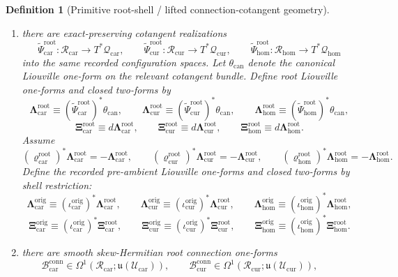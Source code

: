 \documentclass[11pt]{article}
\newcommand{\RootTensorClass}{\mathscr U_{\mathrm{car}}}
\newcommand{\RootRelabelClass}{\mathscr U_{\mathrm{cur}}}
\newcommand{\TensorConfigSpace}{\mathcal Q_{\mathrm{car}}}
\newcommand{\CurConfigSpace}{\mathcal Q_{\mathrm{cur}}}
\newcommand{\HomConfigSpace}{\mathcal Q_{\mathrm{hom}}}
\newcommand{\TensorOriginLiouville}{\boldsymbol{\Lambda}_{\mathrm{car}}^{\mathrm{orig}}}
\newcommand{\CurOriginLiouville}{\boldsymbol{\Lambda}_{\mathrm{cur}}^{\mathrm{orig}}}
\newcommand{\HomOriginLiouville}{\boldsymbol{\Lambda}_{\mathrm{hom}}^{\mathrm{orig}}}
\newcommand{\TensorOriginTwo}{\boldsymbol{\Xi}_{\mathrm{car}}^{\mathrm{orig}}}
\newcommand{\CurOriginTwo}{\boldsymbol{\Xi}_{\mathrm{cur}}^{\mathrm{orig}}}
\newcommand{\HomOriginTwo}{\boldsymbol{\Xi}_{\mathrm{hom}}^{\mathrm{orig}}}
\newcommand{\TensorRootSpace}{\mathcal R_{\mathrm{car}}}
\newcommand{\CurRootSpace}{\mathcal R_{\mathrm{cur}}}
\newcommand{\HomRootSpace}{\mathcal R_{\mathrm{hom}}}
\newcommand{\TensorRootTimeRev}{\varrho_{\mathrm{car}}^{\mathrm{root}}}
\newcommand{\CurRootTimeRev}{\varrho_{\mathrm{cur}}^{\mathrm{root}}}
\newcommand{\HomRootTimeRev}{\varrho_{\mathrm{hom}}^{\mathrm{root}}}
\newcommand{\TensorOriginInc}{\iota_{\mathrm{car}}^{\mathrm{orig}}}
\newcommand{\CurOriginInc}{\iota_{\mathrm{cur}}^{\mathrm{orig}}}
\newcommand{\HomOriginInc}{\iota_{\mathrm{hom}}^{\mathrm{orig}}}
\newcommand{\TensorRootCotangentRealization}{\widetilde{\Psi}_{\mathrm{car}}^{\mathrm{root}}}
\newcommand{\CurRootCotangentRealization}{\widetilde{\Psi}_{\mathrm{cur}}^{\mathrm{root}}}
\newcommand{\HomRootCotangentRealization}{\widetilde{\Psi}_{\mathrm{hom}}^{\mathrm{root}}}
\newcommand{\TensorRootLiouville}{\boldsymbol{\Lambda}_{\mathrm{car}}^{\mathrm{root}}}
\newcommand{\CurRootLiouville}{\boldsymbol{\Lambda}_{\mathrm{cur}}^{\mathrm{root}}}
\newcommand{\HomRootLiouville}{\boldsymbol{\Lambda}_{\mathrm{hom}}^{\mathrm{root}}}
\newcommand{\TensorRootTwo}{\boldsymbol{\Xi}_{\mathrm{car}}^{\mathrm{root}}}
\newcommand{\CurRootTwo}{\boldsymbol{\Xi}_{\mathrm{cur}}^{\mathrm{root}}}
\newcommand{\HomRootTwo}{\boldsymbol{\Xi}_{\mathrm{hom}}^{\mathrm{root}}}
\newcommand{\TensorRootConnectionForm}{\mathcal B_{\mathrm{car}}^{\mathrm{conn}}}
\newcommand{\CurRootConnectionForm}{\mathcal B_{\mathrm{cur}}^{\mathrm{conn}}}
\newcommand{\LieU}{\mathfrak u}
\newtheorem{definition}{Definition}
\begin{document}
\begin{definition}[Primitive root-shell / lifted connection-cotangent geometry]
\begin{enumerate}
\begin{equation}
    \end{equation}
    \item there are exact-preserving cotangent realizations
    \[
    \TensorRootCotangentRealization:\TensorRootSpace\to T^*\TensorConfigSpace,\qquad
    \CurRootCotangentRealization:\CurRootSpace\to T^*\CurConfigSpace,\qquad
    \HomRootCotangentRealization:\HomRootSpace\to T^*\HomConfigSpace
    \]
    into the same recorded configuration spaces. Let \(\theta_{\mathrm{can}}\) denote the canonical Liouville one-form on the relevant cotangent bundle. Define root Liouville one-forms and closed two-forms by
    \begin{equation}
    \TensorRootLiouville\equiv(\TensorRootCotangentRealization)^*\theta_{\mathrm{can}},\qquad
    \CurRootLiouville\equiv(\CurRootCotangentRealization)^*\theta_{\mathrm{can}},\qquad
    \HomRootLiouville\equiv(\HomRootCotangentRealization)^*\theta_{\mathrm{can}},
    \label{eq:root_liouville}
    \end{equation}
    \begin{equation}
    \TensorRootTwo\equiv d\TensorRootLiouville,\qquad
    \CurRootTwo\equiv d\CurRootLiouville,\qquad
    \HomRootTwo\equiv d\HomRootLiouville.
    \label{eq:root_two}
    \end{equation}
    Assume
    \[
    (\TensorRootTimeRev)^*\TensorRootLiouville=-\TensorRootLiouville,\qquad
    (\CurRootTimeRev)^*\CurRootLiouville=-\CurRootLiouville,\qquad
    (\HomRootTimeRev)^*\HomRootLiouville=-\HomRootLiouville.
    \]
    Define the recorded pre-ambient Liouville one-forms and closed two-forms by shell restriction:
    \begin{equation}
    \TensorOriginLiouville\equiv(\TensorOriginInc)^*\TensorRootLiouville,\qquad
    \CurOriginLiouville\equiv(\CurOriginInc)^*\CurRootLiouville,\qquad
    \HomOriginLiouville\equiv(\HomOriginInc)^*\HomRootLiouville,
    \label{eq:origin_liouville_from_root}
    \end{equation}
    \begin{equation}
    \TensorOriginTwo\equiv(\TensorOriginInc)^*\TensorRootTwo,\qquad
    \CurOriginTwo\equiv(\CurOriginInc)^*\CurRootTwo,\qquad
    \HomOriginTwo\equiv(\HomOriginInc)^*\HomRootTwo.
    \label{eq:origin_two_from_root}
    \end{equation}
    \item there are smooth skew-Hermitian root connection one-forms
    \[
    \TensorRootConnectionForm\in\Omega^1(\TensorRootSpace;\LieU(\RootTensorClass)),\qquad
    \CurRootConnectionForm\in\Omega^1(\CurRootSpace;\LieU(\RootRelabelClass)),\qquad
\]
\end{enumerate}
\end{definition}
\end{document}

